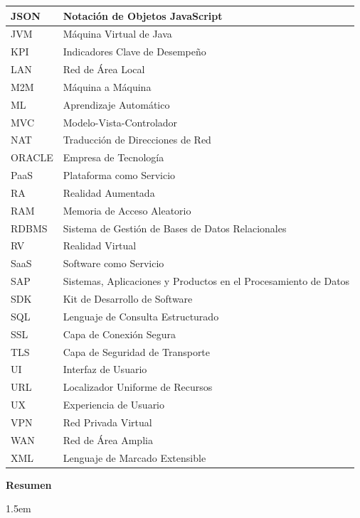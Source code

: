 \documentclass[
  11pt,
  bookmarksnumbered]{article}
\begin{document}
\begin{table}[H]
\begin{tabular}{|l|l|}
JSON & Notación de Objetos JavaScript \\ \hline
JVM & Máquina Virtual de Java \\ \hline
KPI & Indicadores Clave de Desempeño \\ \hline
LAN & Red de Área Local \\ \hline
M2M & Máquina a Máquina \\ \hline
ML & Aprendizaje Automático \\ \hline
MVC & Modelo-Vista-Controlador \\ \hline
NAT & Traducción de Direcciones de Red \\ \hline
ORACLE & Empresa de Tecnología \\ \hline
PaaS & Plataforma como Servicio \\ \hline
RA & Realidad Aumentada \\ \hline
RAM & Memoria de Acceso Aleatorio \\ \hline
RDBMS & Sistema de Gestión de Bases de Datos Relacionales \\ \hline
RV & Realidad Virtual \\ \hline
SaaS & Software como Servicio \\ \hline
SAP & Sistemas, Aplicaciones y Productos en el Procesamiento de Datos \\ \hline
SDK & Kit de Desarrollo de Software \\ \hline
SQL & Lenguaje de Consulta Estructurado \\ \hline
SSL & Capa de Conexión Segura \\ \hline
TLS & Capa de Seguridad de Transporte \\ \hline
UI & Interfaz de Usuario \\ \hline
URL & Localizador Uniforme de Recursos \\ \hline
UX & Experiencia de Usuario \\ \hline
VPN & Red Privada Virtual \\ \hline
WAN & Red de Área Amplia \\ \hline
XML & Lenguaje de Marcado Extensible \\ \hline
\end{tabular}
\end{table}

\newpage

\begin{center}
\textbf{Resumen}
\end{center}

\par
\begingroup
\leftskip1.5em
\rightskip\leftskip
\end{document}
